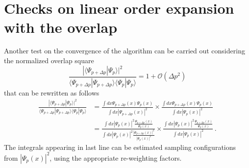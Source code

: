 \documentclass[a4paper,12pt,]{article}
\begin{document}
\section{Checks on linear order expansion with the overlap}
Another test on the convergence of the algorithm can be carried out considering the normalized overlap square
\begin{equation}
\frac{|\langle \Psi_{p+ \Delta p} | \Psi_p\rangle|^2 }{\langle \Psi_{p+\Delta p} | \Psi_{p+\Delta p} \rangle \langle \Psi_p | \Psi_p \rangle} = 1 + \mathcal{O}(\Delta p^2)
\end{equation}
that can be rewritten as follows
\begin{align}
\frac{|\langle \Psi_{p+ \Delta p} | \Psi_p \rangle|^2 }{\langle \Psi_{p+\Delta p} | \Psi_{p+\Delta p} \rangle \langle \Psi_p | \Psi_p\rangle} &=
\frac{\int dx \Psi_{p+\Delta p} (x) \Psi_{p} (x) }{\int dx |\Psi_{p+\Delta p} (x)|^2} \times \frac{\int dx \Psi_{p+\Delta p} (x) \Psi_{p} (x) }{\int dx |\Psi_{p} (x)|^2}\nonumber\\
&=\frac{\int dx  |\Psi_{p} (x)|^2 \frac{\Psi_{p+\Delta p} (x)}{ \Psi_{p} (x)} }{\int dx |\Psi_{p} (x)|^2 \frac{|\Psi_{p+\Delta p} (x)|^2}{|\Psi_{p} (x)|^2}}
\times \frac{\int dx  |\Psi_{p} (x)|^2 \frac{\Psi_{p+\Delta p} (x)}{ \Psi_{p} (x)} }{\int dx |\Psi_{p} (x)|^2}\, .
\end{align}
The integrals appearing in last line can be estimated sampling configurations from $|\Psi_p (x)|^2$, using the appropriate re-weighting factors. 





%
%
%
\end{document}
